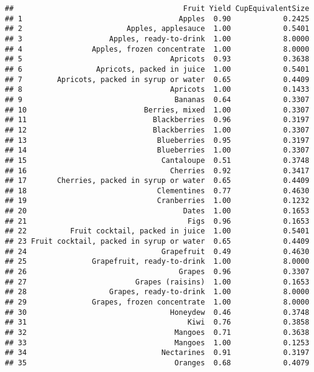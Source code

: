 \documentclass[
]{article}
\begin{document}
\begin{verbatim}
##                                       Fruit Yield CupEquivalentSize
## 1                                    Apples  0.90            0.2425
## 2                        Apples, applesauce  1.00            0.5401
## 3                    Apples, ready-to-drink  1.00            8.0000
## 4                Apples, frozen concentrate  1.00            8.0000
## 5                                  Apricots  0.93            0.3638
## 6                 Apricots, packed in juice  1.00            0.5401
## 7        Apricots, packed in syrup or water  0.65            0.4409
## 8                                  Apricots  1.00            0.1433
## 9                                   Bananas  0.64            0.3307
## 10                           Berries, mixed  1.00            0.3307
## 11                             Blackberries  0.96            0.3197
## 12                             Blackberries  1.00            0.3307
## 13                              Blueberries  0.95            0.3197
## 14                              Blueberries  1.00            0.3307
## 15                               Cantaloupe  0.51            0.3748
## 16                                 Cherries  0.92            0.3417
## 17       Cherries, packed in syrup or water  0.65            0.4409
## 18                              Clementines  0.77            0.4630
## 19                              Cranberries  1.00            0.1232
## 20                                    Dates  1.00            0.1653
## 21                                     Figs  0.96            0.1653
## 22          Fruit cocktail, packed in juice  1.00            0.5401
## 23 Fruit cocktail, packed in syrup or water  0.65            0.4409
## 24                               Grapefruit  0.49            0.4630
## 25               Grapefruit, ready-to-drink  1.00            8.0000
## 26                                   Grapes  0.96            0.3307
## 27                         Grapes (raisins)  1.00            0.1653
## 28                   Grapes, ready-to-drink  1.00            8.0000
## 29               Grapes, frozen concentrate  1.00            8.0000
## 30                                 Honeydew  0.46            0.3748
## 31                                     Kiwi  0.76            0.3858
## 32                                  Mangoes  0.71            0.3638
## 33                                  Mangoes  1.00            0.1253
## 34                               Nectarines  0.91            0.3197
## 35                                  Oranges  0.68            0.4079

\end{verbatim}
\end{document}
